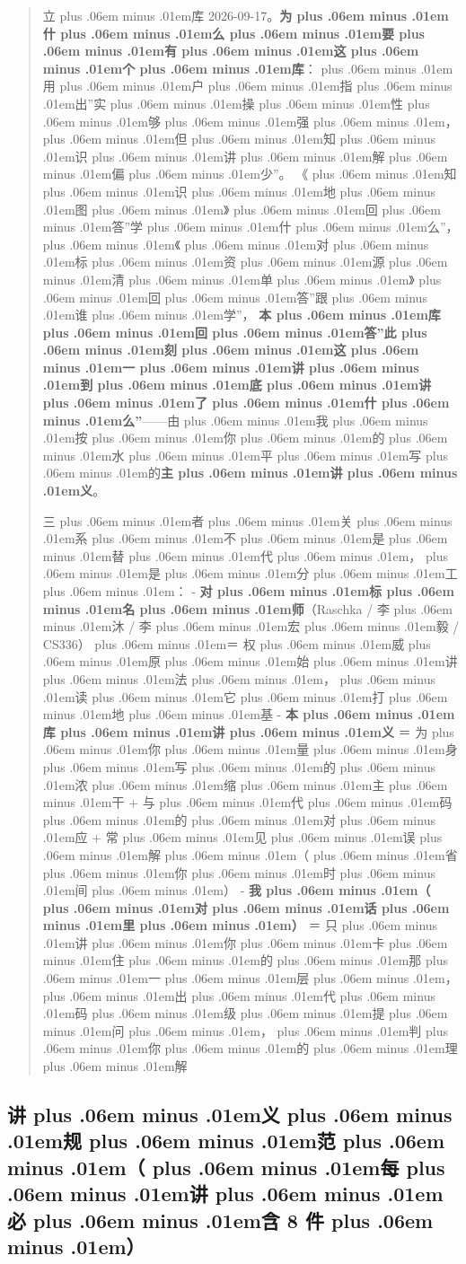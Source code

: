 \documentclass[
]{article}
\def\zh#1{{\zhfont #1}}
\def\zhglue{\hskip0pt plus .06em minus .01em}
\begin{document}
\begin{quote}
\zh{立\zhglue 库} 2026-09-17\zh{。}\textbf{\zh{为\zhglue 什\zhglue 么\zhglue 要\zhglue 有\zhglue 这\zhglue 个\zhglue 库}}\zh{：\zhglue 用\zhglue 户\zhglue 指\zhglue 出}''\zh{实\zhglue 操\zhglue 性\zhglue 够\zhglue 强\zhglue ，\zhglue 但\zhglue 知\zhglue 识\zhglue 讲\zhglue 解\zhglue 偏\zhglue 少}''\zh{。} \zh{《\zhglue 知\zhglue 识\zhglue 地\zhglue 图\zhglue 》\zhglue 回\zhglue 答}''\zh{学\zhglue 什\zhglue 么}''\zh{，\zhglue 《\zhglue 对\zhglue 标\zhglue 资\zhglue 源\zhglue 清\zhglue 单\zhglue 》\zhglue 回\zhglue 答}''\zh{跟\zhglue 谁\zhglue 学}''\zh{，} \textbf{\zh{本\zhglue 库\zhglue 回\zhglue 答}''\zh{此\zhglue 刻\zhglue 这\zhglue 一\zhglue 讲\zhglue 到\zhglue 底\zhglue 讲\zhglue 了\zhglue 什\zhglue 么}''}------\zh{由\zhglue 我\zhglue 按\zhglue 你\zhglue 的\zhglue 水\zhglue 平\zhglue 写\zhglue 的}\textbf{\zh{主\zhglue 讲\zhglue 义}}\zh{。}

\zh{三\zhglue 者\zhglue 关\zhglue 系\zhglue 不\zhglue 是\zhglue 替\zhglue 代\zhglue ，\zhglue 是\zhglue 分\zhglue 工\zhglue ：} - \textbf{\zh{对\zhglue 标\zhglue 名\zhglue 师}}\zh{（}Raschka / \zh{李\zhglue 沐} / \zh{李\zhglue 宏\zhglue 毅} / CS336\zh{）\zhglue ＝} \zh{权\zhglue 威\zhglue 原\zhglue 始\zhglue 讲\zhglue 法\zhglue ，\zhglue 读\zhglue 它\zhglue 打\zhglue 地\zhglue 基} - \textbf{\zh{本\zhglue 库\zhglue 讲\zhglue 义}} \zh{＝} \zh{为\zhglue 你\zhglue 量\zhglue 身\zhglue 写\zhglue 的\zhglue 浓\zhglue 缩\zhglue 主\zhglue 干} + \zh{与\zhglue 代\zhglue 码\zhglue 的\zhglue 对\zhglue 应} + \zh{常\zhglue 见\zhglue 误\zhglue 解\zhglue （\zhglue 省\zhglue 你\zhglue 时\zhglue 间\zhglue ）} - \textbf{\zh{我\zhglue （\zhglue 对\zhglue 话\zhglue 里\zhglue ）}} \zh{＝} \zh{只\zhglue 讲\zhglue 你\zhglue 卡\zhglue 住\zhglue 的\zhglue 那\zhglue 一\zhglue 层\zhglue ，\zhglue 出\zhglue 代\zhglue 码\zhglue 级\zhglue 提\zhglue 问\zhglue ，\zhglue 判\zhglue 你\zhglue 的\zhglue 理\zhglue 解}
\end{quote}

\subsection{\zh{讲\zhglue 义\zhglue 规\zhglue 范\zhglue （\zhglue 每\zhglue 讲\zhglue 必\zhglue 含} 8 \zh{件\zhglue ）}}\label{ux8bb2ux4e49ux89c4ux8303ux6bcfux8bb2ux5fc5ux542b-8-ux4ef6}
\end{document}

